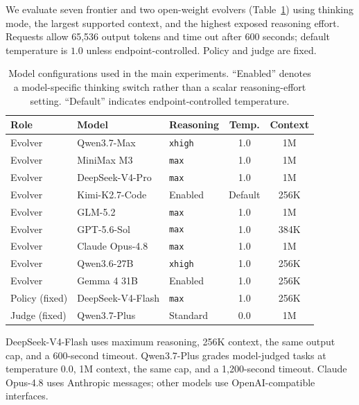 We evaluate seven frontier and two open-weight evolvers
(Table~\ref{tab:model-configurations}) using thinking mode, the largest supported
context, and the highest exposed reasoning effort.  Requests allow 65,536
output tokens and time out after 600 seconds; default
temperature is $1.0$ unless endpoint-controlled.  Policy and judge are fixed.


\begin{table}[htbp]
\centering
\small
\caption{Model configurations used in the main experiments.  ``Enabled''
denotes a model-specific thinking switch rather than a scalar reasoning-effort
setting.  ``Default'' indicates endpoint-controlled temperature.}
\label{tab:model-configurations}
\begin{tabular*}{\textwidth}{@{\extracolsep{\fill}}lllcc@{}}
\toprule
\textbf{Role} & \textbf{Model} & \textbf{Reasoning} & \textbf{Temp.} & \textbf{Context} \\
\midrule
Evolver & Qwen3.7-Max       & \texttt{xhigh} & 1.0 & 1M \\
Evolver & MiniMax M3        & \texttt{max}   & 1.0 & 1M \\
Evolver & DeepSeek-V4-Pro   & \texttt{max}   & 1.0 & 1M \\
Evolver & Kimi-K2.7-Code    & Enabled        & Default & 256K \\
Evolver & GLM-5.2           & \texttt{max}   & 1.0 & 1M \\
Evolver & GPT-5.6-Sol       & \texttt{max}   & 1.0 & 384K \\
Evolver & Claude Opus-4.8   & \texttt{max}   & 1.0 & 1M \\
Evolver & Qwen3.6-27B       & \texttt{xhigh} & 1.0 & 256K \\
Evolver & Gemma 4 31B       & Enabled        & 1.0 & 256K \\
\midrule
Policy (fixed) & DeepSeek-V4-Flash & \texttt{max} & 1.0 & 256K \\
Judge (fixed)  & Qwen3.7-Plus      & Standard & 0.0 & 1M \\
\bottomrule
\end{tabular*}
\end{table}
DeepSeek-V4-Flash uses maximum reasoning, 256K context, the same output cap, and
a 600-second timeout.  Qwen3.7-Plus grades model-judged tasks at temperature
$0.0$, 1M context, the same cap, and a 1,200-second timeout.  Claude Opus-4.8
uses Anthropic messages; other models use OpenAI-compatible interfaces.

